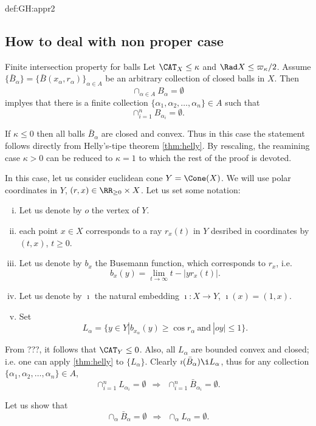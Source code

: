 {\begin{subthm}{def:GH:appr2}
\subsection{How to deal with non proper case}

\begin{thm} {Finite intersection property for balls}\label{finite intersection of balls}
Let $\CAT_X\le \kappa$ and $\Rad X\le\varpi_\kappa/2$.
Assume $\{\bar B_\alpha\}=\{\bar B(x_\alpha,r_\alpha)\}_{\alpha\in A}$ be an arbitrary collection of closed balls in $X$.
Then 
$$\cap_{\alpha\in A}B_\alpha=\emptyset$$
implyes that there is a finite collection 
$\{\alpha_1,\alpha_2,\dots,\alpha_n\}\in A$ 
such that
$$\cap_{i=1}^nB_{\alpha_i}=\emptyset.$$
\end{thm}

If $\kappa\le 0$ then all balls $\bar B_\alpha$ are closed and convex.
Thus in this case the statement follows directly from Helly's-tipe theorem \ref{thm:helly}.
By rescaling, the reamining case $\kappa>0$ 
can be reduced to $\kappa=1$ to which the rest 
of the proof is devoted.

In this case, let us consider euclidean cone $Y=\Cone(X)$. 
We will use polar coordinates in $Y$,
$(r,x)\in\RR_{\ge0}\times X$. Let us set some notation:
\begin{enumerate}[(i)]
\item Let us denote by $o$ the vertex of $Y$.
\item each point $x\in X$ corresponds to a ray
$r_x(t)$ in $Y$ desribed in coordinates by $(t,x)$, $t\ge 0$.
\item Let us denote by $b_x$ the Busemann function, which corresponds to $r_x$, i.e.
$$b_x(y)=\lim_{t\to\infty}t-|yr_x(t)|.$$
\item Let us denote by $\imath$ the natural embedding $\imath:X\to Y$, 
$\imath(x)=(1,x)$.
\item Set
$$L_\alpha=\{y\in Y|b_{x_\alpha}(y)\ge \cos r_\alpha\ \text{and}\  |oy|\le 1\}.$$
\end{enumerate} 

From ???, it follows that $\CAT_Y\le 0$.
Also, all $L_\alpha$ are bounded convex and closed;
i.e. one can apply \ref{thm:helly} to $\{L_\alpha\}$.
Clearly $\imath(\bar B_\alpha)\i L_\alpha$, thus for any collection
$\{\alpha_1,\alpha_2,\dots,\alpha_n\}\in A$,
$$\cap_{i=1}^n L_{\alpha_i}=\emptyset 
\ \ 
\Longrightarrow
\ \ 
\cap_{i=1}^n \bar B_{\alpha_i}=\emptyset.$$

Let us show that 
$$\cap_\alpha \bar B_\alpha=\emptyset 
\ \ 
\Longrightarrow
\ \ 
\cap_\alpha L_\alpha=\emptyset.$$


\end{subthm}}
